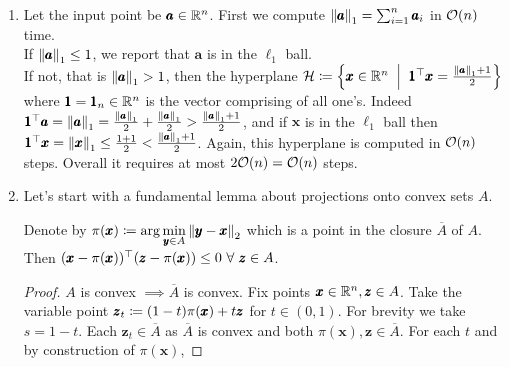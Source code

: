 \begin{enumerate}[label=(\alph*)]
\item Let the input point be $\pmb a\in \mathbb{R}^{n}$. First we compute $\left\lVert \pmb a \right\rVert_{1} = \sum_{i=1}^{n}\pmb a_{i}$ in ${\mathcal{O}}(n)$ time. \\
If $\left\lVert \pmb a \right\rVert_{1} \le 1$, we report that $\pmb a$ is in the $\ell_{1}$ ball. \\
If not, that is $\left\lVert \pmb a \right\rVert_{1} >1$, then the hyperplane $\cH \sett \set{\pmb x\in\R^{n}\st \pmb 1^{\top}\pmb x = \frac{\norm{\pmb a}1+1}{2}}$ where $\pmb 1 = \pmb 1_{n}\in\mathbb{R}^{n}$ is the vector comprising of all one's. Indeed $\pmb 1^{\top} \pmb a = \left\lVert \pmb a \right\rVert_{1} = \frac{\left\lVert \pmb a \right\rVert_{1}}{2} + \frac{\left\lVert \pmb a \right\rVert_{1}}{2} > \frac{\left\lVert \pmb a \right\rVert_{1}+1}{2}$, and if $\pmb x$ is in the $\ell_{1}$ ball then $\pmb 1^{\top}\pmb x = \left\lVert \pmb x \right\rVert_{1} \le \frac{1+1}{2} < \frac{\left\lVert \pmb a \right\rVert_{1}+1}{2}$. Again, this hyperplane is computed in ${\mathcal{O}}(n)$ steps. Overall it requires at most $2{\mathcal{O}}(n) = {\mathcal{O}}(n)$ steps.

\item Let's start with a fundamental lemma about projections onto convex sets $A$.
\begin{lemma}\label{obs}
Denote by $\displaystyle\pi(\pmb x) \coloneqq \arg\min_{\pmb y\in A}\left\lVert \pmb y-\pmb x \right\rVert_{2}$ which is a point in the closure $\overline A$ of $A$. Then $(\pmb x-\pi(\pmb x))^{\top}(\pmb z-\pi(\pmb x))\le 0~\forall~ \pmb z\in A$.
\end{lemma}
\begin{proof}
$A$ is convex $\implies \overline A$ is convex. Fix points $\pmb x\in\mathbb{R}^{n},\pmb z\in A$. Take the variable point $\pmb z_{t}\coloneqq (1-t)\pi(\pmb x) + t\pmb z$ for $t\in (0,1)$. For brevity we take $s=1-t$. Each $\pmb z_{t}\in \overline A$ as $\overline A$ is convex and both $\pi(\pmb x),\pmb z\in \overline A$. For each $t$ and by construction of $\pi(\pmb x)$, 


\end{proof}
\end{enumerate}
